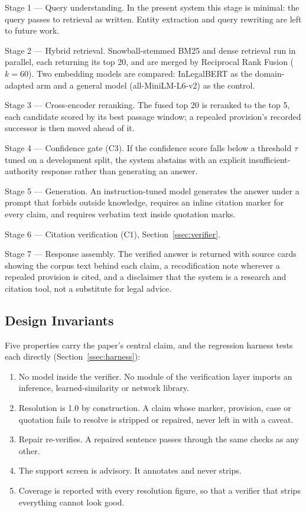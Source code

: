 \documentclass[conference]{IEEEtran}
\begin{document}
Stage 1 --- Query understanding. In the present system this stage is minimal: the query passes to retrieval as written. Entity extraction and query rewriting \cite{patil2025} are left to future work.

Stage 2 --- Hybrid retrieval. Snowball-stemmed BM25 and dense retrieval run in parallel, each returning its top 20, and are merged by Reciprocal Rank Fusion ($k=60$). Two embedding models are compared: InLegalBERT \cite{paul2023} as the domain-adapted arm and a general model (all-MiniLM-L6-v2) as the control.

Stage 3 --- Cross-encoder reranking. The fused top 20 is reranked to the top 5, each candidate scored by its best passage window; a repealed provision's recorded successor is then moved ahead of it.

Stage 4 --- Confidence gate (C3). If the confidence score falls below a threshold $\tau$ tuned on a development split, the system abstains with an explicit insufficient-authority response rather than generating an answer.

Stage 5 --- Generation. An instruction-tuned model generates the answer under a prompt that forbids outside knowledge, requires an inline citation marker for every claim, and requires verbatim text inside quotation marks.

Stage 6 --- Citation verification (C1), Section~\ref{ssec:verifier}.

Stage 7 --- Response assembly. The verified answer is returned with source cards showing the corpus text behind each claim, a recodification note wherever a repealed provision is cited, and a disclaimer that the system is a research and citation tool, not a substitute for legal advice.

\subsection{Design Invariants}
\label{ssec:invariants}

Five properties carry the paper's central claim, and the regression harness tests each directly (Section~\ref{ssec:harness}):

\begin{enumerate}
\item[I1] No model inside the verifier. No module of the verification layer imports an inference, learned-similarity or network library.
\item[I2] Resolution is 1.0 by construction. A claim whose marker, provision, case or quotation fails to resolve is stripped or repaired, never left in with a caveat.
\item[I3] Repair re-verifies. A repaired sentence passes through the same checks as any other.
\item[I4] The support screen is advisory. It annotates and never strips.
\item[I5] Coverage is reported with every resolution figure, so that a verifier that strips everything cannot look good.
\end{enumerate}
\end{document}
